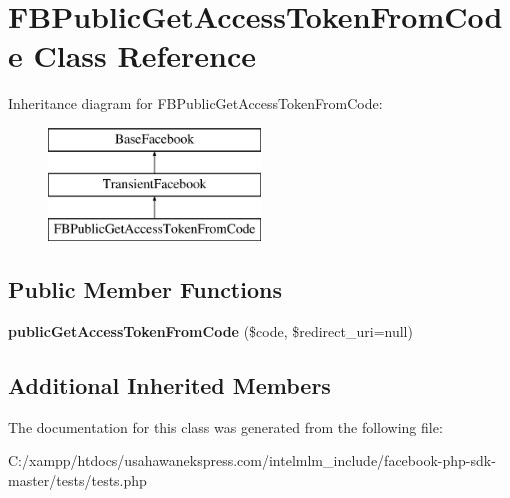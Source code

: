 \hypertarget{class_f_b_public_get_access_token_from_code}{\section{F\-B\-Public\-Get\-Access\-Token\-From\-Code Class Reference}
\label{class_f_b_public_get_access_token_from_code}
}
Inheritance diagram for F\-B\-Public\-Get\-Access\-Token\-From\-Code\-:\begin{figure}[H]
\begin{center}
\leavevmode
\includegraphics[height=3.000000cm]{class_f_b_public_get_access_token_from_code}
\end{center}
\end{figure}
\subsection*{Public Member Functions}
\begin{DoxyCompactItemize}
\item 
\hypertarget{class_f_b_public_get_access_token_from_code_a7b8421d1ce1f990d1f0ff0b204864e4a}{{\bfseries public\-Get\-Access\-Token\-From\-Code} (\$code, \$redirect\-\_\-uri=null)}\label{class_f_b_public_get_access_token_from_code_a7b8421d1ce1f990d1f0ff0b204864e4a}

\end{DoxyCompactItemize}
\subsection*{Additional Inherited Members}


The documentation for this class was generated from the following file\-:\begin{DoxyCompactItemize}
\item 
C\-:/xampp/htdocs/usahawanekspress.\-com/intelmlm\-\_\-include/facebook-\/php-\/sdk-\/master/tests/tests.\-php\end{DoxyCompactItemize}
